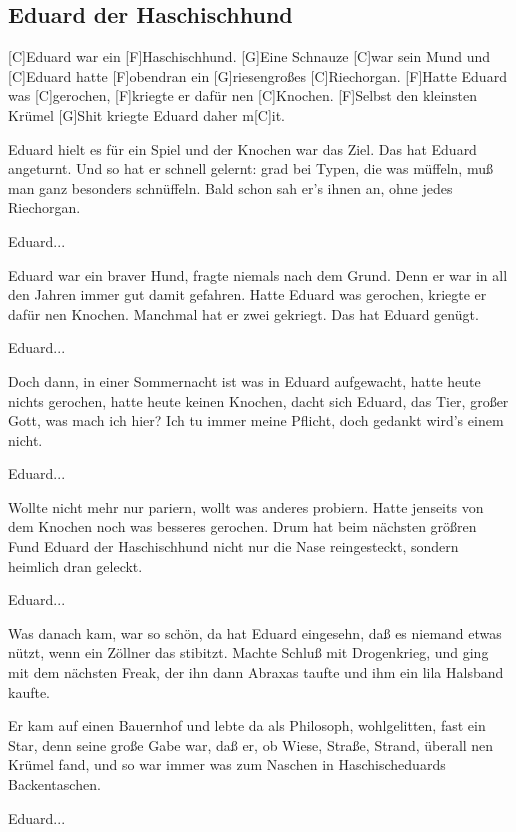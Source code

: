 \subsection*{Eduard der Haschischhund   }
\begin{multicols}{2}
\begin{guitar}

    [C]Eduard war ein [F]Haschischhund.
    [G]Eine Schnauze [C]war sein Mund
    und [C]Eduard hatte [F]obendran
    ein [G]riesengroßes [C]Riechorgan.
    [F]Hatte Eduard was [C]gerochen,
    [F]kriegte er dafür nen [C]Knochen.
    [F]Selbst den kleinsten Krümel [G]Shit
    kriegte Eduard daher m[C]it.


    Eduard hielt es für ein Spiel
    und der Knochen war das Ziel.
    Das hat Eduard angeturnt.
    Und so hat er schnell gelernt:
    grad bei Typen, die was müffeln,
    muß man ganz besonders schnüffeln.
    Bald schon sah er's ihnen an,
    ohne jedes Riechorgan.


    Eduard...


    Eduard war ein braver Hund,
    fragte niemals nach dem Grund.
    Denn er war in all den Jahren
    immer gut damit gefahren.
    Hatte Eduard was gerochen,
    kriegte er dafür nen Knochen.
    Manchmal hat er zwei gekriegt.
    Das hat Eduard genügt.


    Eduard...


    Doch dann, in einer Sommernacht
    ist was in Eduard aufgewacht,
    hatte heute nichts gerochen,
    hatte heute keinen Knochen,
    dacht sich Eduard, das Tier,
    großer Gott, was mach ich hier?
    Ich tu immer meine Pflicht,
    doch gedankt wird's einem nicht.


    Eduard...


    \columnbreak
    Wollte nicht mehr nur pariern,
    wollt was anderes probiern.
    Hatte jenseits von dem Knochen
    noch was besseres gerochen.
    Drum hat beim nächsten größren Fund
    Eduard der Haschischhund
    nicht nur die Nase reingesteckt,
    sondern heimlich dran geleckt.


    Eduard...


    Was danach kam, war so schön,
    da hat Eduard eingesehn,
    daß es niemand etwas nützt,
    wenn ein Zöllner das stibitzt.
    Machte Schluß mit Drogenkrieg,
    und ging mit dem nächsten Freak,
    der ihn dann Abraxas taufte
    und ihm ein lila Halsband kaufte.


    Er kam auf einen Bauernhof
    und lebte da als Philosoph,
    wohlgelitten, fast ein Star,
    denn seine große Gabe war,
    daß er, ob Wiese, Straße, Strand,
    überall nen Krümel fand,
    und so war immer was zum Naschen
    in Haschischeduards Backentaschen.


    Eduard...

 

\end{guitar}
\end{multicols}
